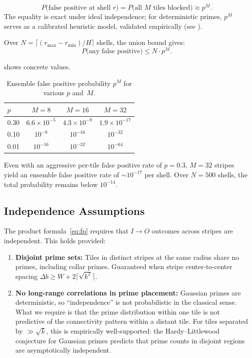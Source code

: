 \documentclass[11pt,a4paper]{article}
\theoremstyle{definition}
\theoremstyle{remark}
\newcommand{\IO}{I{\to}O}
\begin{document}
\begin{equation}\label{eq:fp}
  P\bigl(\text{false positive at shell } r\bigr)
  = P\bigl(\text{all } M \text{ tiles blocked}\bigr)
  \approx p^M.
\end{equation}
The equality is exact under ideal independence; for deterministic
primes, $p^M$ serves as a calibrated heuristic model, validated
empirically (see ).

Over $N = \lceil(r_{\max} - r_{\min})/H\rceil$ shells, the union
bound gives:
\begin{equation}\label{eq:fp_total}
  P\bigl(\text{any false positive}\bigr)
  \le N \cdot p^M.
\end{equation}

 shows concrete values.

\begin{table}[ht]
\centering
\caption{Ensemble false positive probability $p^M$ for various $p$ and~$M$.}
\label{tab:fp}
\begin{tabular}{@{}lccc@{}}
\toprule
$p$ & $M = 8$ & $M = 16$ & $M = 32$ \\
\midrule
0.30 & $6.6 \times 10^{-5}$  & $4.3 \times 10^{-9}$  & $1.9 \times 10^{-17}$ \\
0.10 & $10^{-8}$             & $10^{-16}$             & $10^{-32}$            \\
0.01 & $10^{-16}$            & $10^{-32}$             & $10^{-64}$            \\
\bottomrule
\end{tabular}
\end{table}

\noindent
Even with an aggressive per-tile false positive rate of $p = 0.3$,
$M = 32$ stripes yield an ensemble false positive rate of
$\sim 10^{-17}$ per shell.  Over $N = 500$ shells, the total
probability remains below $10^{-14}$.

\subsection{Independence Assumptions}

The product formula~\eqref{eq:fp} requires that $\IO$ outcomes across
stripes are independent.  This holds provided:

\begin{enumerate}
  \item \textbf{Disjoint prime sets:} Tiles in distinct stripes at the
    same radius share no primes, including collar primes.  Guaranteed
    when stripe center-to-center spacing $\Delta b \ge W + 2\lceil\sqrt{k^2}\rceil$.
  \item \textbf{No long-range correlations in prime placement:}
    Gaussian primes are deterministic, so ``independence'' is not
    probabilistic in the classical sense.  What we require is that the
    prime distribution within one tile is not predictive of the
    connectivity pattern within a distant tile.  For tiles separated
    by $\gg \sqrt{k}$, this is empirically well-supported: the
    Hardy--Littlewood conjecture for Gaussian primes predicts
    that prime counts in disjoint regions are asymptotically
    independent.
\end{enumerate}
\end{document}

